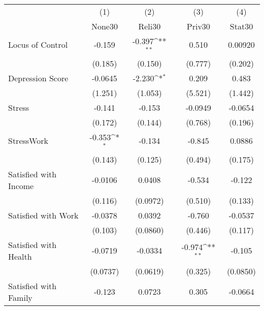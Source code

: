 {
\def\sym#1{\ifmmode^{#1}\else\(^{#1}\)\fi}
\begin{tabular}{l*{4}{c}}
\hline\hline
            &\multicolumn{1}{c}{(1)}&\multicolumn{1}{c}{(2)}&\multicolumn{1}{c}{(3)}&\multicolumn{1}{c}{(4)}\\
            &\multicolumn{1}{c}{None30}&\multicolumn{1}{c}{Reli30}&\multicolumn{1}{c}{Priv30}&\multicolumn{1}{c}{Stat30}\\
\hline
Locus of Control&      -0.159         &      -0.397\sym{**} &       0.510         &     0.00920         \\
            &     (0.185)         &     (0.150)         &     (0.777)         &     (0.202)         \\
[1em]
Depression Score&     -0.0645         &      -2.230\sym{*}  &       0.209         &       0.483         \\
            &     (1.251)         &     (1.053)         &     (5.521)         &     (1.442)         \\
[1em]
Stress      &      -0.141         &      -0.153         &     -0.0949         &     -0.0654         \\
            &     (0.172)         &     (0.144)         &     (0.768)         &     (0.196)         \\
[1em]
StressWork  &      -0.353\sym{*}  &      -0.134         &      -0.845         &      0.0886         \\
            &     (0.143)         &     (0.125)         &     (0.494)         &     (0.175)         \\
[1em]
Satisfied with Income&     -0.0106         &      0.0408         &      -0.534         &      -0.122         \\
            &     (0.116)         &    (0.0972)         &     (0.510)         &     (0.133)         \\
[1em]
Satisfied with Work&     -0.0378         &      0.0392         &      -0.760         &     -0.0537         \\
            &     (0.103)         &    (0.0860)         &     (0.446)         &     (0.117)         \\
[1em]
Satisfied with Health&     -0.0719         &     -0.0334         &      -0.974\sym{**} &      -0.105         \\
            &    (0.0737)         &    (0.0619)         &     (0.325)         &    (0.0850)         \\
[1em]
Satisfied with Family&      -0.123         &      0.0723         &       0.305         &     -0.0664         \\

\end{tabular}}

